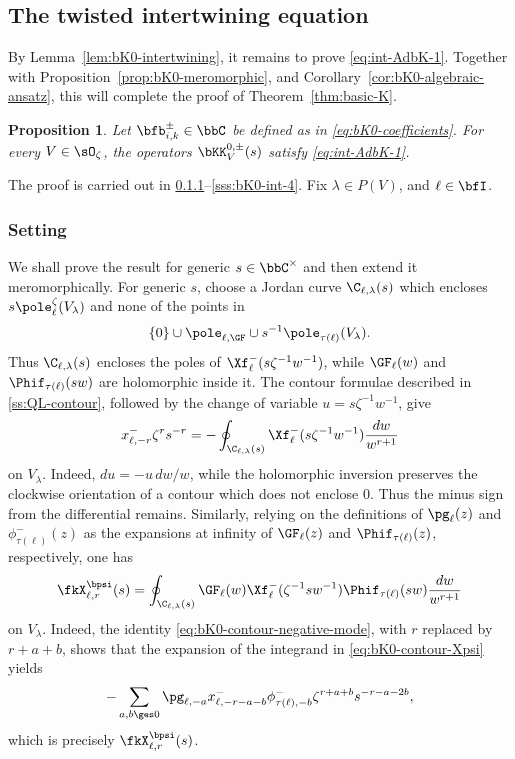 \documentclass[reqno]{amsart}
\numberwithin{equation}{section}
\newtheorem*{proposition}{Proposition}
\begin{document}
\subsection{The twisted intertwining equation}
\label{ss:bK0-intertwining-main}
By Lemma~\ref{lem:bK0-intertwining}, it remains to prove \eqref{eq:int-AdbK-1}. 
Together with Proposition~\ref{prop:bK0-meromorphic},
and Corollary~\ref{cor:bK0-algebraic-ansatz}, this will complete the proof of
Theorem~\ref{thm:basic-K}.

\begin{proposition}
Let $\bfb_{i,k}^\pm\in\bbC$ be defined as in \eqref{eq:bK0-coefficients}.
For every $V\in\sO_\zeta$, the operators $\bKK^{0,\pm}_V(s)$ satisfy \eqref{eq:int-AdbK-1}.
\end{proposition}

The proof is carried out in \ref{sss:bK0-int-1}--\ref{sss:bK0-int-4}.
Fix $\lambda\in P(V)$, and $\ell\in\bfI$.

\subsubsection{Setting}\label{sss:bK0-int-1}
We shall prove the result for generic $s\in\bbC^\times$ and then extend it meromorphically.
For generic $s$, choose a Jordan curve $\C_{\ell,\lambda}(s)$ which
encloses $s\pole_\ell^\zeta(V_\lambda)$ and none of the points in
\begin{equation}
\{0\}\cup\pole_{\ell,\GF}\cup
s^{-1}\pole_{\tau(\ell)}(V_\lambda).
\end{equation}
Thus $\C_{\ell,\lambda}(s)$ encloses the poles of
$\Xf_\ell^-(s\zeta^{-1}w^{-1})$, while $\GF_\ell(w)$ and
$\Phif_{\tau(\ell)}(sw)$ are holomorphic inside it. The contour formulae
described in \ref{ss:QL-contour}, followed by the change of variable
$u=s\zeta^{-1}w^{-1}$, give
\begin{equation}\label{eq:bK0-contour-negative-mode}
x^-_{\ell,-r}\zeta^rs^{-r}
=
-\oint_{\C_{\ell,\lambda}(s)}
\Xf_\ell^-(s\zeta^{-1}w^{-1})\frac{dw}{w^{r+1}}
\end{equation}
on $V_\lambda$.
Indeed, $du=-u\,dw/w$, while the holomorphic inversion preserves the
clockwise orientation of a contour which does not enclose $0$. Thus the
minus sign from the differential remains.
Similarly, relying on the definitions of $\pg_\ell(z)$ and
$\phi^-_{\tau(\ell)}(z)$ as the expansions at infinity of
$\GF_\ell(z)$ and $\Phif_{\tau(\ell)}(z)$, respectively, one has
\begin{equation}\label{eq:bK0-contour-Xpsi}
\fkX_{\ell,r}^{\bpsi}(s)
=
\oint_{\C_{\ell,\lambda}(s)}
\GF_\ell(w)
\Xf_\ell^-(\zeta^{-1}sw^{-1})
\Phif_{\tau(\ell)}(sw)
\frac{dw}{w^{r+1}}
\end{equation}
on $V_\lambda$.
Indeed, the identity \eqref{eq:bK0-contour-negative-mode}, with $r$ replaced by
$r+a+b$, shows that the expansion of the integrand in
\eqref{eq:bK0-contour-Xpsi} yields
\begin{equation}
-\sum_{a,b\ges0}
\pg_{\ell,-a}
x^-_{\ell,-r-a-b}
\phi^-_{\tau(\ell),-b}
\zeta^{r+a+b}s^{-r-a-2b},
\end{equation}
which is precisely $\fkX_{\ell,r}^{\bpsi}(s)$.
\end{document}
